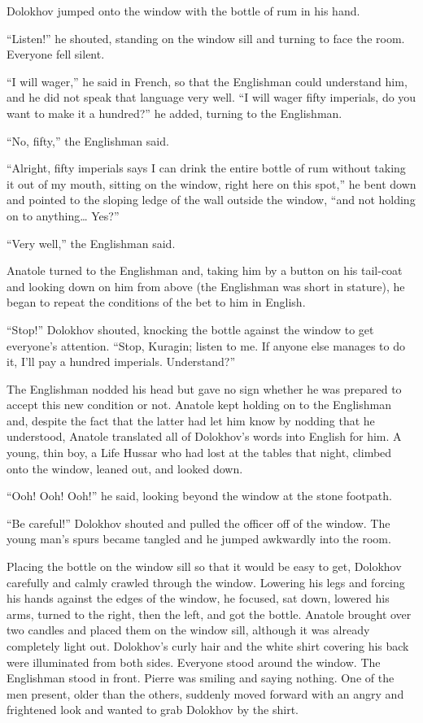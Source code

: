 Dolokhov jumped onto the window with the bottle of rum in his hand.

``Listen!'' he shouted, standing on the window sill and turning to face the room. Everyone fell silent. %

``I will wager,'' he said in French, so that the Englishman could understand him, and he did not speak that language very well. ``I will wager fifty imperials, do you want to make it a hundred?'' he added, turning to the Englishman. %

``No, fifty,'' the Englishman said. %

``Alright, fifty imperials says I can drink the entire bottle of rum without taking it out of my mouth, sitting on the window, right here on this spot,'' he bent down and pointed to the sloping ledge of the wall outside the window, ``and not holding on to anything\ldots{} Yes?'' %

``Very well,'' the Englishman said. %

Anatole turned to the Englishman and, taking him by a button on his tail-coat and looking down on him from above (the Englishman was short in stature), he began to repeat the conditions of the bet to him in English.

``Stop!'' Dolokhov shouted, knocking the bottle against the window to get everyone's attention. ``Stop, Kuragin; listen to me. If anyone else manages to do it, I'll pay a hundred imperials. Understand?'' %

The Englishman nodded his head but gave no sign whether he was prepared to accept this new condition or not. Anatole kept holding on to the Englishman and, despite the fact that the latter had let him know by nodding that he understood, Anatole translated all of Dolokhov's words into English for him. A young, thin boy, a Life Hussar who had lost at the tables that night, climbed onto the window, leaned out, and looked down.

``Ooh! Ooh! Ooh!'' he said, looking beyond the window at the stone footpath.

``Be careful!'' Dolokhov shouted and pulled the officer off of the window. The young man's spurs became tangled and he jumped awkwardly into the room.

Placing the bottle on the window sill so that it would be easy to get, Dolokhov carefully and calmly crawled through the window. Lowering his legs and forcing his hands against the edges of the window, he focused, sat down, lowered his arms, turned to the right, then the left, and got the bottle. Anatole brought over two candles and placed them on the window sill, although it was already completely light out. Dolokhov's curly hair and the white shirt covering his back were illuminated from both sides. Everyone stood around the window. The Englishman stood in front. Pierre was smiling and saying nothing. One of the men present, older than the others, suddenly moved forward with an angry and frightened look and wanted to grab Dolokhov by the shirt.

